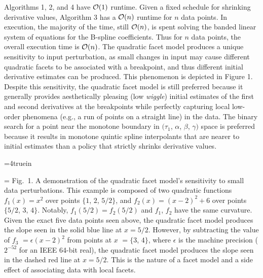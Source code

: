 Algorithms 1, 2, and 4 have ${\cal O}(1)$ runtime. Given a fixed
schedule for shrinking derivative values, Algorithm 3 has a ${\cal
  O}(n)$ runtime for $n$ data points. In execution, the majority of
the time, still ${\cal O}(n)$, is spent solving the banded linear
system of equations for the B-spline coefficients. Thus for $n$ data
points, the overall execution time is ${\cal O}(n)$. The quadratic
facet model produces a unique sensitivity to input perturbation, as
small changes in input may cause different quadratic facets to be
associated with a breakpoint, and thus different initial derivative
estimates can be produced. This phenomenon is depicted in Figure
1. Despite this sensitivity, the quadratic facet model is still
preferred because it generally provides aesthetically pleasing (low
{\it wiggle}) initial estimates of the first and second derivatives at
the breakpoints while perfectly capturing local low-order phenomena
(e.g., a run of points on a straight line) in the data. The binary
search for a point near the monotone boundary in $(\tau_1$, $\alpha$,
$\beta$, $\gamma)$ space is preferred because it results in monotone
quintic spline interpolants that are nearer to initial estimates than
a policy that strictly shrinks derivative values.

\topinsert
\centerline{\epsfxsize=4truein }
{\everymath={\scriptstyle}
\narrower\noindent\rmVIII Fig.\ 1. A demonstration of the quadratic
  facet model's sensitivity to small data perturbations. This example is
  composed of two quadratic functions $f_1(x) = x^2$ over points $\{1$,
  $2$, $5/2\}$, and $f_2(x) = (x-2)^2 + 6$ over points $\{5/2$, $3$,
  $4\}$. Notably, $f_1(5/2) = f_2(5/2)$ and $f_1$, $f_2$ have the same
  curvature. Given the exact five data points seen above, the quadratic
  facet model produces the slope seen in the solid blue line at $x = 5/2$.
  However, by subtracting the value of $f_3$ $= \epsilon(x-2)^2$ from
  points at $x$ $= \{3$, $4\}$, where $\epsilon$ is the machine precision
  ($2^{-52}$ for an IEEE 64-bit real), the quadratic facet model produces
  the slope seen in the dashed red line at $x = 5/2$. This is the nature
  of a facet model and a side effect of associating data with local facets.
\par} \endinsert
